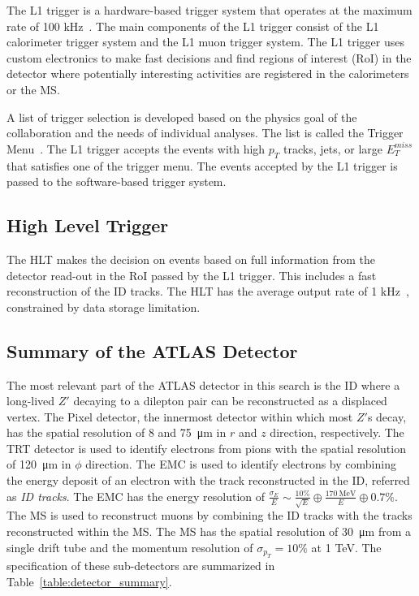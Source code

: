 The L1 trigger is a hardware-based trigger system that operates at the maximum rate of 100 \si{\kilo\hertz}~\cite{1742-6596-762-1-012003}. The main components of the L1 trigger consist of the L1 calorimeter trigger system and the L1 muon trigger system. The L1 trigger uses custom electronics to make fast decisions and find regions of interest (RoI) in the detector where potentially interesting activities are registered in the calorimeters or the MS.

A list of trigger selection is developed based on the physics goal of the collaboration and the needs of individual analyses. The list is called the Trigger Menu~\cite{VazquezSchroeder:2287548}. The L1 trigger accepts the events with high $p_{T}$ tracks, jets, or large $E_{T}^{miss}$ that satisfies one of the trigger menu. The events accepted by the L1 trigger is passed to the software-based trigger system.


\subsection{High Level Trigger}
\label{sec:atlas:hlt}

The HLT makes the decision on events based on full information from the detector read-out in the RoI passed by the L1 trigger. This includes a fast reconstruction of the ID tracks. The HLT has the average output rate of 1 \si{\kilo\hertz}~\cite{1742-6596-762-1-012003}, constrained by data storage limitation. 


\subsection{Summary of the ATLAS Detector}
\label{sec:atlas:summary}

The most relevant part of the ATLAS detector in this search is the ID where a long-lived $Z'$ decaying to a dilepton pair can be reconstructed as a displaced vertex. The Pixel detector, the innermost detector within which most $Z'$s decay, has the spatial resolution of 8 and 75~\si{\micro\meter} in $r$ and $z$ direction, respectively. The TRT detector is used to identify electrons from pions with the spatial resolution of 120~\si{\micro\meter} in $\phi$ direction. The EMC is used to identify electrons by combining the energy deposit of an electron with the track reconstructed in the ID, referred as \textit{ID tracks}. The EMC has the energy resolution of $\frac{\sigma_{E}}{E} \sim \frac{10\%}{\sqrt{E}}\oplus\frac{170~\mathrm{MeV}}{E}\oplus 0.7\%$. The MS is used to reconstruct muons by combining the ID tracks with the tracks reconstructed within the MS. The MS has the spatial resolution of 30~\si{\micro\meter} from a single drift tube and the momentum resolution of $\sigma_{p_{T}} = 10\%$ at 1 TeV. The specification of these sub-detectors are summarized in Table~\ref{table:detector_summary}.

